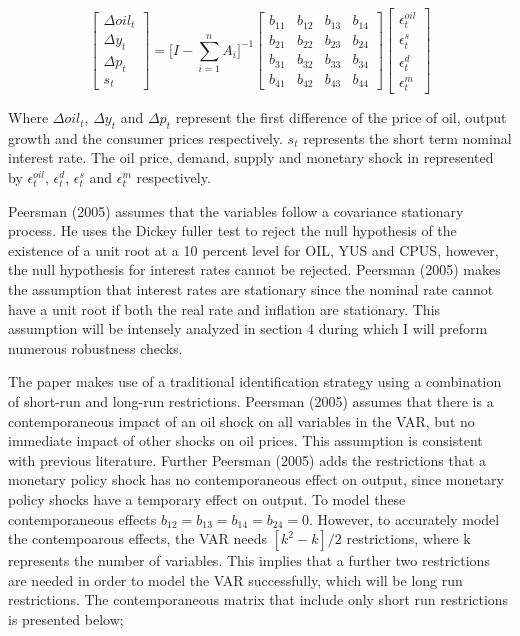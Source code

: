 \documentclass[11pt,preprint, authoryear]{elsarticle}
\numberwithin{equation}{section}
\numberwithin{figure}{section}
\numberwithin{table}{section}
\begin{document}
\[\begin{bmatrix} \Delta oil_t \\ \Delta y_t \\ \Delta p_t \\ s_t \end{bmatrix} = \Biggl[ I - \sum_{i=1}^{n} A_i \Biggl]^{-1} \begin{bmatrix} b_{11}& b_{12}& b_{13} & b_{14} \\
b_{21}& b_{22}& b_{23} & b_{24} \\
b_{31}& b_{32}& b_{33} & b_{34} \\
b_{41}& b_{42}& b_{43} & b_{44} \end{bmatrix} \begin{bmatrix} \epsilon_t^{oil} \\ \epsilon_t^{s} \\ \epsilon_t^{d} \\ \epsilon_t^{m} \end{bmatrix}\]

Where \(\Delta oil_t\), \(\Delta y_t\) and \(\Delta p_t\) represent the
first difference of the price of oil, output growth and the consumer
prices respectively. \(s_t\) represents the short term nominal interest
rate. The oil price, demand, supply and monetary shock in represented by
\(\epsilon_t^{oil}\), \(\epsilon_t^{d}\), \(\epsilon_t^{s}\) and
\(\epsilon_t^{m}\) respectively.

Peersman (2005) assumes that the variables follow a covariance
stationary process. He uses the Dickey fuller test to reject the null
hypothesis of the existence of a unit root at a 10 percent level for
OIL, YUS and CPUS, however, the null hypothesis for interest rates
cannot be rejected. Peersman (2005) makes the assumption that interest
rates are stationary since the nominal rate cannot have a unit root if
both the real rate and inflation are stationary. This assumption will be
intensely analyzed in section 4 during which I will preform numerous
robustness checks.

The paper makes use of a traditional identification strategy using a
combination of short-run and long-run restrictions. Peersman (2005)
assumes that there is a contemporaneous impact of an oil shock on all
variables in the VAR, but no immediate impact of other shocks on oil
prices. This assumption is consistent with previous literature. Further
Peersman (2005) adds the restrictions that a monetary policy shock has
no contemporaneous effect on output, since monetary policy shocks have a
temporary effect on output. To model these contemporaneous effects
\(b_{12} = b_{13} = b_{14} = b_{24} = 0\). However, to accurately model
the contempoarous effects, the VAR needs \([k^2-k]/2\) restrictions,
where k represents the number of variables. This implies that a further
two restrictions are needed in order to model the VAR successfully,
which will be long run restrictions. The contemporaneous matrix that
include only short run restrictions is presented below;
\end{document}
